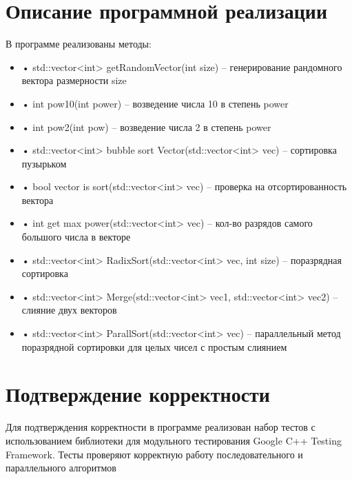 \documentclass{report}
\begin{document}
\section*{Описание программной реализации}
В программе реализованы методы:
\begin{itemize}
\item[]•	std::vector<int> getRandomVector(int size) – генерирование рандомного вектора размерности size
\end{itemize}
\begin{itemize}
\item[]•	int pow10(int power) – возведение числа 10 в степень power
\end{itemize}
\begin{itemize}
\item[]•	int pow2(int pow) – возведение числа 2 в степень power
\end{itemize}
\begin{itemize}
\item[]•	std::vector<int> bubble sort Vector(std::vector<int> vec) – сортировка пузырьком
\end{itemize}
\begin{itemize}
\item[]•	bool vector is sort(std::vector<int> vec) – проверка на отсортированность вектора
\end{itemize}
\begin{itemize}
\item[]•	int get max power(std::vector<int> vec) –  кол-во разрядов самого большого числа в векторе
\end{itemize}
\begin{itemize}
\item[]•	std::vector<int> RadixSort(std::vector<int> vec, int size) – поразрядная сортировка
\end{itemize}
\begin{itemize}
\item[]•	std::vector<int> Merge(std::vector<int> vec1, std::vector<int> vec2) – слияние двух векторов
\end{itemize}
\begin{itemize}
\item[]•	std::vector<int> ParallSort(std::vector<int> vec) – параллельный метод поразрядной сортировки для целых чисел с простым слиянием
\end{itemize}
\newpage
\section*{Подтверждение корректности}
Для подтверждения корректности в программе реализован набор тестов с использованием библиотеки для модульного тестирования Google C++ Testing Framework. Тесты проверяют корректную работу последовательного и параллельного алгоритмов
\newpage
\end{document}
